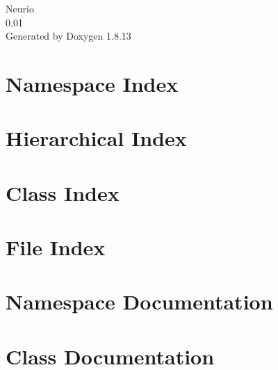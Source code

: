 \documentclass[twoside]{book}
\newcommand{\+}{\discretionary{\mbox{\scriptsize$\hookleftarrow$}}{}{}}
\newcommand{\clearemptydoublepage}{%
  \newpage{\pagestyle{empty}\cleardoublepage}%
}
\begin{document}
\hypersetup{pageanchor=false,
             bookmarksnumbered=true,
             pdfencoding=unicode
            }
\begin{titlepage}
\vspace*{7cm}
\begin{center}%
{\Large Neurio \\[1ex]\large 0.\+01 }\\
\vspace*{1cm}
{\large Generated by Doxygen 1.8.13}\\
\end{center}
\end{titlepage}
\clearemptydoublepage
{}
\tableofcontents
\clearemptydoublepage
{}
\hypersetup{pageanchor=true}

\chapter{Namespace Index}

\chapter{Hierarchical Index}

\chapter{Class Index}

\chapter{File Index}

\chapter{Namespace Documentation}






\chapter{Class Documentation}















\end{document}
